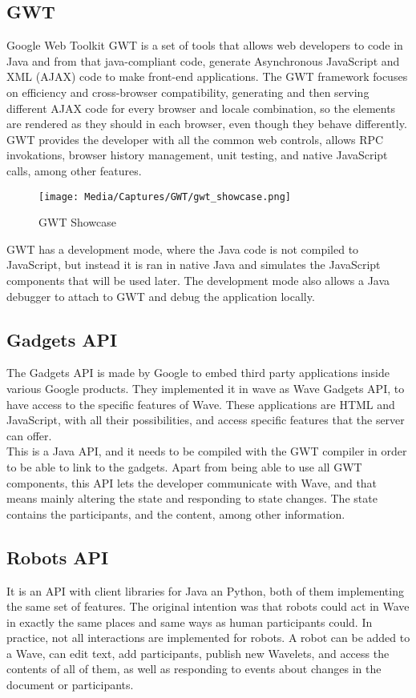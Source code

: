 \subsection{GWT}
Google Web Toolkit GWT is a set of tools that allows web developers to code in Java and from that java-compliant code, generate Asynchronous JavaScript and XML (AJAX) code to make front-end applications. The GWT framework focuses on efficiency and cross-browser compatibility, generating and then serving different AJAX code for every browser and locale combination, so the elements are rendered as they should in each browser, even though they behave differently. GWT provides the developer with all the common web controls, allows RPC invokations, browser history management, unit testing, and native JavaScript calls, among other features.\\[.2cm]
\begin{figure}[h]
  \center
    \texttt{[image: Media/Captures/GWT/gwt\_showcase.png]}
  \caption{GWT Showcase}
  \label{fig:gwt_showcase}
\end{figure}
GWT has a development mode, where the Java code is not compiled to JavaScript, but instead it is ran in native Java and simulates the JavaScript components that will be used later. The development mode also allows a Java debugger to attach to GWT and debug the application locally. 

\subsection{Gadgets API}
The Gadgets API is made by Google to embed third party applications inside various Google products. They implemented it in wave as Wave Gadgets API, to have access to the specific features of Wave. These applications are HTML and JavaScript, with all their possibilities, and access specific features that the server can offer.\\[.3cm]
This is a Java API, and it needs to be compiled with the GWT compiler in order to be able to link to the gadgets. Apart from being able to use all GWT components, this API lets the developer communicate with Wave, and that means mainly altering the state and responding to state changes. The state contains the participants, and the content, among other information. 

\subsection{Robots API}
It is an API with client libraries for Java an Python, both of them implementing the same set of features. The original intention was that robots could act in Wave in exactly the same places and same ways as human participants could. In practice, not all interactions are implemented for robots. A robot can be added to a Wave, can edit text, add participants, publish new Wavelets, and access the contents of all of them, as well as responding to events about changes in the document or participants.

